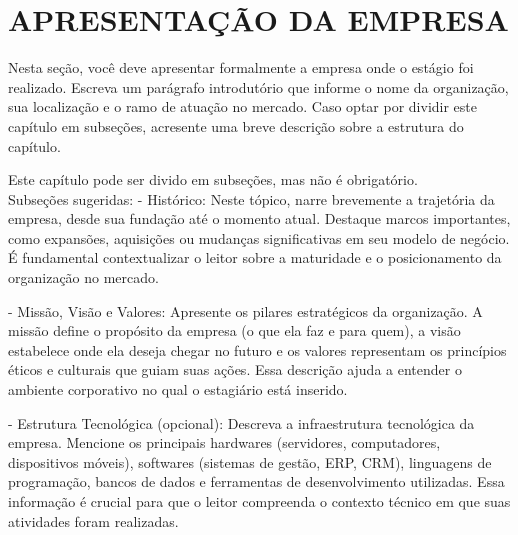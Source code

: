 
\chapter{APRESENTAÇÃO DA EMPRESA} 
\label{ch:apresentacao-empresa}

Nesta seção, você deve apresentar formalmente a empresa onde o estágio foi realizado. 
Escreva um parágrafo introdutório que informe o nome da organização, sua localização e o ramo de atuação no mercado. 
Caso optar por dividir este capítulo em subseções, acresente uma breve descrição sobre a estrutura do capítulo.

Este capítulo pode ser divido em subseções, mas não é obrigatório. 
\\Subseções sugeridas:
- Histórico: Neste tópico, narre brevemente a trajetória da empresa, desde sua fundação até o momento atual. Destaque marcos importantes, como expansões, aquisições ou mudanças significativas em seu modelo de negócio. É fundamental contextualizar o leitor sobre a maturidade e o posicionamento da organização no mercado.

- Missão, Visão e Valores: Apresente os pilares estratégicos da organização. A missão define o propósito da empresa (o que ela faz e para quem), a visão estabelece onde ela deseja chegar no futuro e os valores representam os princípios éticos e culturais que guiam suas ações. Essa descrição ajuda a entender o ambiente corporativo no qual o estagiário está inserido.

- Estrutura Tecnológica (opcional): Descreva a infraestrutura tecnológica da empresa. Mencione os principais hardwares (servidores, computadores, dispositivos móveis), softwares (sistemas de gestão, ERP, CRM), linguagens de programação, bancos de dados e ferramentas de desenvolvimento utilizadas. Essa informação é crucial para que o leitor compreenda o contexto técnico em que suas atividades foram realizadas.